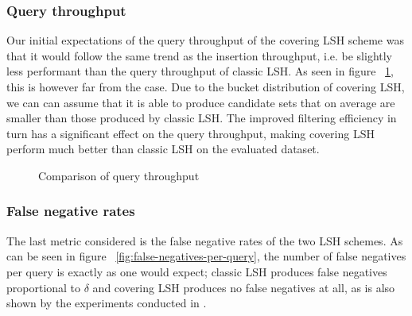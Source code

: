 \subsubsection{Query throughput}

Our initial expectations of the query throughput of the covering LSH scheme was that it would follow the same trend as the insertion throughput, i.e. be slightly less performant than the query throughput of classic LSH. As seen in figure ~\ref{fig:queries-per-second}, this is however far from the case. Due to the bucket distribution of covering LSH, we can can assume that it is able to produce candidate sets that on average are smaller than those produced by classic LSH. The improved filtering efficiency in turn has a significant effect on the query throughput, making covering LSH perform much better than classic LSH on the evaluated dataset.

\begin{figure}[ht]
  \centering

  \caption{Comparison of query throughput}
  \label{fig:queries-per-second}
\end{figure}

\subsubsection{False negative rates}

The last metric considered is the false negative rates of the two LSH schemes. As can be seen in figure ~\ref{fig:false-negatives-per-query}, the number of false negatives per query is exactly as one would expect; classic LSH produces false negatives proportional to $\delta$ and covering LSH produces no false negatives at all, as is also shown by the experiments conducted in \cite{DBLP:journals/corr/PhamP16}.

